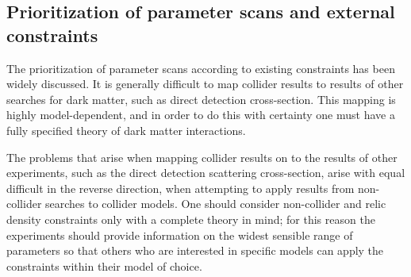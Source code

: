 \documentclass[a4,debug,notitlepage,nobib]{tufte-handout}
\begin{document}



\subsection{Prioritization of parameter scans and external constraints}

The prioritization of parameter scans according to existing constraints 
has been widely discussed. It is generally difficult to map
collider results to results of other searches for dark matter, such as
direct detection cross-section. This mapping is highly
model-dependent, and in order to do this with certainty one must have
a fully specified theory of dark matter interactions. 

The problems that arise when mapping collider results on to the
results of other experiments, such as the direct detection scattering
cross-section, arise with equal difficult in the reverse direction,
when attempting to apply results from non-collider searches to
collider models. One should consider non-collider and relic density
constraints only with a complete theory in mind; for this reason the
experiments should provide information on the widest sensible range of
parameters so that others who are interested in specific models can
apply the constraints within their model of choice.
\end{document}
